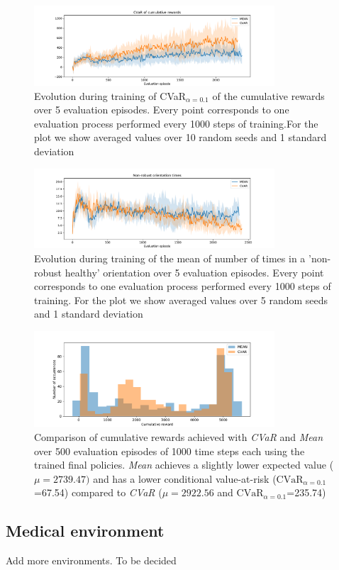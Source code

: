 \begin{figure}[ht]
    \centering
    \includegraphics[width=0.8\textwidth]{images/Walker_offpolicy_expert/cvar_train_withstds.pdf}
    \caption{Evolution during training of CVaR$_{\alpha=0.1}$ of the cumulative rewards over 5 evaluation episodes.
    Every point corresponds to one evaluation process performed every 1000 steps of training.For the plot we
    show averaged values over 10 random seeds and 1 standard deviation}
    \label{fig:cvar_walker}

\end{figure}



\begin{figure}[ht]
    \centering
    \includegraphics[width=0.8\textwidth]{images/Walker_offpolicy_expert/times_exceedvel_withstds.pdf}
    \caption{Evolution during training of the mean of number of times in a 'non-robust healthy'
    orientation over  5 evaluation episodes.
    Every point corresponds to one evaluation process performed every 1000 steps of training.
    For the plot we show averaged values over 5 random seeds and 1 standard deviation
    }
    \label{fig:vel_exceed_walker}

\end{figure}

\begin{figure}[ht]
\centering
\includegraphics[width=0.8\textwidth]{images/Walker_offpolicy_expert/hist_evaluation_numevalsteps1000.pdf}
\caption{Comparison of cumulative rewards achieved with \textit{CVaR} and \textit{Mean}
over 500 evaluation episodes of 1000 time steps each using the trained final policies.
\textit{Mean} achieves a slightly lower expected value ($\mu=2739.47)$ and 
has a lower conditional value-at-risk ($\text{CVaR}_{\alpha= 0.1}$=67.54) compared to
\textit{CVaR} ($\mu=2922.56$ and $\text{CVaR}_{\alpha= 0.1}$=235.74)}
\label{fig:hist_cum_rewards_walker}
\end{figure}

\clearpage
\subsection{Medical environment}
Add more environments. To be decided